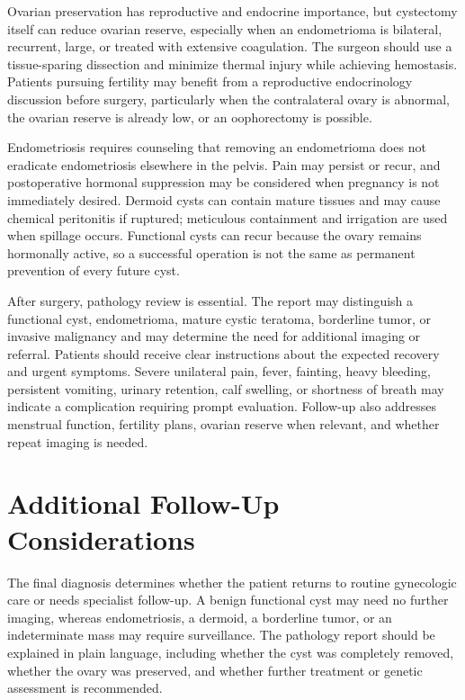 Ovarian preservation has reproductive and endocrine importance, but cystectomy itself can reduce ovarian reserve, especially when an endometrioma is bilateral, recurrent, large, or treated with extensive coagulation. The surgeon should use a tissue-sparing dissection and minimize thermal injury while achieving hemostasis. Patients pursuing fertility may benefit from a reproductive endocrinology discussion before surgery, particularly when the contralateral ovary is abnormal, the ovarian reserve is already low, or an oophorectomy is possible.

Endometriosis requires counseling that removing an endometrioma does not eradicate endometriosis elsewhere in the pelvis. Pain may persist or recur, and postoperative hormonal suppression may be considered when pregnancy is not immediately desired. Dermoid cysts can contain mature tissues and may cause chemical peritonitis if ruptured; meticulous containment and irrigation are used when spillage occurs. Functional cysts can recur because the ovary remains hormonally active, so a successful operation is not the same as permanent prevention of every future cyst.

After surgery, pathology review is essential. The report may distinguish a functional cyst, endometrioma, mature cystic teratoma, borderline tumor, or invasive malignancy and may determine the need for additional imaging or referral. Patients should receive clear instructions about the expected recovery and urgent symptoms. Severe unilateral pain, fever, fainting, heavy bleeding, persistent vomiting, urinary retention, calf swelling, or shortness of breath may indicate a complication requiring prompt evaluation. Follow-up also addresses menstrual function, fertility plans, ovarian reserve when relevant, and whether repeat imaging is needed.

\section*{Additional Follow-Up Considerations}
The final diagnosis determines whether the patient returns to routine gynecologic care or needs specialist follow-up. A benign functional cyst may need no further imaging, whereas endometriosis, a dermoid, a borderline tumor, or an indeterminate mass may require surveillance. The pathology report should be explained in plain language, including whether the cyst was completely removed, whether the ovary was preserved, and whether further treatment or genetic assessment is recommended.

